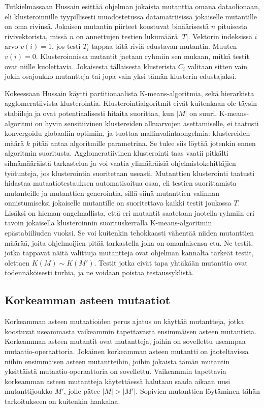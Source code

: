 \documentclass{tktltiki}
\begin{document}
Tutkielmassaan Hussain esittää ohjelman jokaista mutanttia omana dataolionaan, eli klusteroinnille tyypillisesti muodostetussa datamatriisissa jokaiselle mutantille on oma rivinsä. Jokaisen mutantin piirteet koostuvat binäärisestä $n$ pituisesta rivivektorista, missä $n$ on annettujen testien lukumäärä $|T|$. Vektorin indeksissä $i$ arvo $v(i) = 1$, jos testi $T_i$ tappaa tätä riviä edustavan mutantin. Muuten $v(i) = 0$. Klusteroinnissa mutantit jaetaan ryhmiin sen mukaan, mitkä testit ovat niille kuolettavia. Jokaisesta tällaisesta klusterista $C_{i}$ valitaan sitten vain jokin osajoukko mutantteja tai jopa vain yksi tämän klusterin edustajaksi. 

Kokeessaan Hussain käytti partitionaalista K-means-algoritmia, sekä hierarkista agglomeratiivista klusterointia. Klusterointialgoritmit eivät kuitenkaan ole täysin stabiileja ja ovat potentiaalisesti hitaita suorittaa, kun $|M|$ on suuri. K-means-algoritmi on hyvin sensitiivinen klustereiden alkuarvojen asettamiselle, ei taatusti konvergoidu globaaliin optimiin, ja tuottaa mallinvalintaongelmia: klustereiden määrä $k$ pitää antaa algoritmille parametrina. Se tulee siis löytää jotenkin ennen algoritmin suoritusta. Agglomeratiivinen klusterointi taas vaatii pitkälti silmämääräistä tarkastelua ja voi vaatia ylimääräisiä ohjelmistokehittäjien työtunteja, jos klusterointia suoritetaan useasti. Mutanttien klusterointi taatusti hidastaa mutaatiotestauksen automatisoitua osaa, eli testien suorittamista mutanteille ja mutanttien generointia, sillä siinä mutanttien valinnan onnistumiseksi jokaiselle mutantille on suoritettava kaikki testit joukossa $T$. Lisäksi on hieman ongelmallista, että eri mutantit saatetaan jaotella ryhmiin eri tavoin jokaisella klusteroinnin suorituskerralla K-means-algoritmin epästabiiliuden vuoksi. Se voi kuitenkin tehokkaasti vähentää niiden mutanttien määrää, joita ohjelmoijien pitää tarkastella joka on omanlaisensa etu. Ne testit, jotka tappavat näitä valittuja mutantteja ovat ohjelman kannalta tärkeät testit, olettaen $K(M) \sim K(M')$. Testit jotka eivät tapa yhtäkään mutanttia ovat todennäköisesti turhia, ja ne voidaan poistaa testaussyklistä.

\subsection{Korkeamman asteen mutaatiot}
Korkeamman asteen mutaatioiden perus ajatus on käyttää mutantteja, jotka koostuvat useammasta vaikeammin tapettavasta ensimmäisen asteen mutantista. Korkeamman asteen mutantit ovat mutantteja, joihin on sovellettu useampaa mutaatio-operaattoria. Jokainen korkeamman asteen mutantti on jaoteltavissa niihin ensimmäisen asteen mutantteihin, joihin jokaista tämän mutantin yksittäistä mutaatio-operaattoria on sovellettu. Vaikeammin tapettavia korkeamman asteen mutantteja käytettäessä halutaan saada aikaan uusi mutanttijoukko $M'$, jolle pätee $|M| > |M'|$. Sopivien mutanttien löytäminen tähän tarkoitukseen on kuitenkin hankalaa. 
\end{document}
